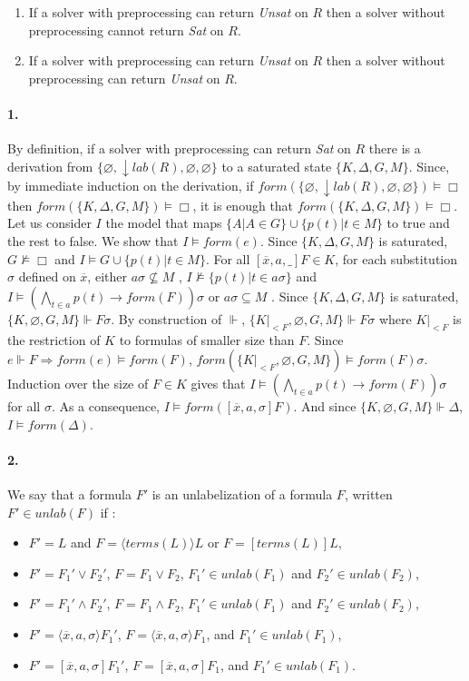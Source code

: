 \documentclass[a4paper,10pt]{report}
\newcommand{\terms}{\mathit{terms}}
\newcommand{\F}{\mathit{form}}
\newcommand{\T}{\mathit{lab}}
\newcommand{\unlab}{\mathit{unlab}}
\begin{document}
\begin{enumerate}
 \item If a solver with preprocessing can return \emph{Unsat} on $R$ then a solver without
preprocessing cannot return \emph{Sat} on $R$.
 \item If a solver with preprocessing can return \emph{Unsat} on $R$ then a solver without
preprocessing can return \emph{Unsat} on $R$.
\end{enumerate}
\paragraph{1.} By definition, if a solver with preprocessing can return \emph{Sat} on $R$ there is a
derivation from $\{\varnothing, \downarrow\T(R), \varnothing, \varnothing\}$ to a saturated state
$\{K, \Delta, G, M\}$. Since, by immediate induction on the derivation, if
$\F(\{\varnothing, \downarrow\T(R), \varnothing, \varnothing\})\vDash\Box$ then
$\F(\{K, \Delta, G, M \})\vDash\Box$, it is enough that $\F(\{K, \Delta, G, M\})\vDash\Box$. Let
us consider $I$ the model that maps $\{A|A\in G\}\cup\{p(t)|t\in M\}$ to true and the rest to false.
We show that $I\vDash\F(e)$. Since $\{K,\Delta, G, M\}$ is saturated, $G\nvDash\Box$
and $I\vDash G\cup\{p(t)|t\in M\}$. For all $[\overline x, a,\_]F\in K$, for
each substitution $\sigma$ defined on $\overline x$, either $a\sigma\nsubseteq M$ ,
$I\nvDash\{p(t)|t\in a\sigma\}$ and $I\vDash(\bigwedge_{t\in a} p(t)\rightarrow\F(F))\sigma$ or
$a\sigma\subseteq M$ . Since $\{K,\Delta, G, M\}$ is saturated, $\{K, \varnothing, G, M\}\Vdash F\sigma$.
By construction of $\Vdash$, $\{K|_{<F} ,\varnothing, G, M\}\Vdash F\sigma$ where $K|_{<F}$ is the
restriction of $K$ to formulas of smaller size than $F$. Since $e\Vdash F\Rightarrow\F(e)\vDash\F(F)$,
$\F(\{K|_{<F} ,\varnothing, G, M\})\vDash\F(F)\sigma$. Induction over the size of $F\in K$
gives that $I\vDash(\bigwedge_{t\in a}p(t)\rightarrow\F(F))\sigma$ for all $\sigma$.
As a consequence, $I\vDash\F([\overline x, a,\sigma]F )$. And since
$\{K, \varnothing, G, M\}\Vdash\Delta$, $I\vDash\F(\Delta)$.
\paragraph{2.}
We say that a formula $F'$ is an unlabelization of a formula $F$, written $F'\in\unlab(F)$ if :
\begin{itemize}
 \item $F'= L$ and $F =\langle\terms(L)\rangle L$ or $F = [\terms(L)]L$,
 \item $F'= F_1'\vee F_2'$, $F = F_1\vee F_2$, $F_1'\in\unlab(F_1)$ and $F_2'\in\unlab(F_2)$,
 \item $F'= F_1'\wedge F_2'$, $F = F_1\wedge F_2$, $F_1'\in\unlab(F_1)$ and $F_2'\in\unlab(F_2)$,
 \item $F'=\langle\overline x, a,\sigma\rangle F_1'$, $F =\langle\overline x, a,\sigma\rangle F_1$,
and $F_1'\in\unlab(F_1)$,
 \item $F' = [\overline x, a,\sigma]F_1'$, $F = [\overline x, a,\sigma]F_1$,
and $F_1'\in\unlab(F_1)$.
\end{itemize}
\end{document}
